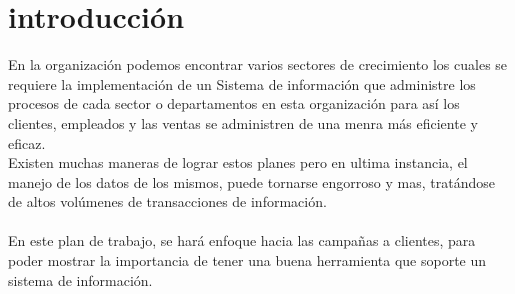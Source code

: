 \chapter*{introducci\'on}
En la organizaci\'on podemos encontrar varios sectores de crecimiento los cuales se requiere la implementaci\'on de un Sistema de informaci\'on que administre los procesos de cada sector o departamentos en esta organizaci\'on para as\'i los clientes, empleados y las ventas se administren de una menra m\'as eficiente y eficaz.%
\\%
Existen muchas maneras de lograr estos planes pero en ultima instancia, el manejo de los datos de los mismos, puede tornarse engorroso y mas, trat\'andose de altos vol\'umenes de transacciones de informaci\'on.%
\\%
\\%
En este plan de trabajo, se har\'a enfoque hacia las campa\~nas a clientes, para poder mostrar la importancia de tener una buena herramienta que soporte un sistema de informaci\'on.%
\\%
\\%
